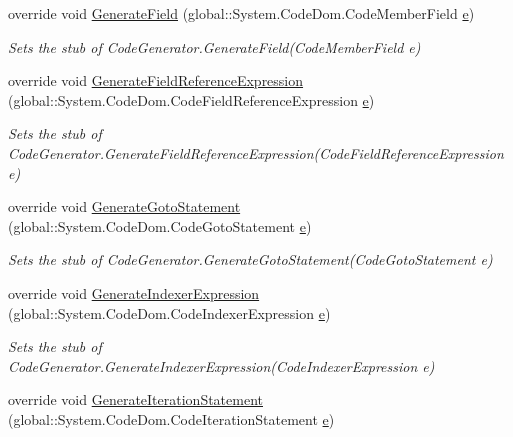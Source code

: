 \begin{DoxyCompactItemize}
override void \hyperlink{class_system_1_1_code_dom_1_1_compiler_1_1_fakes_1_1_stub_code_compiler_a0525ef218029c9289eafd4fbdfe2da62}{Generate\-Field} (global\-::\-System.\-Code\-Dom.\-Code\-Member\-Field \hyperlink{jquery-1_810_82_8min_8js_a2c038346d47955cbe2cb91e338edd7e1}{e})
\begin{DoxyCompactList}\small\item\em Sets the stub of Code\-Generator.\-Generate\-Field(\-Code\-Member\-Field e)\end{DoxyCompactList}\item 
override void \hyperlink{class_system_1_1_code_dom_1_1_compiler_1_1_fakes_1_1_stub_code_compiler_abc06b05254aff7094e113cb6628f3dbc}{Generate\-Field\-Reference\-Expression} (global\-::\-System.\-Code\-Dom.\-Code\-Field\-Reference\-Expression \hyperlink{jquery-1_810_82_8min_8js_a2c038346d47955cbe2cb91e338edd7e1}{e})
\begin{DoxyCompactList}\small\item\em Sets the stub of Code\-Generator.\-Generate\-Field\-Reference\-Expression(\-Code\-Field\-Reference\-Expression e)\end{DoxyCompactList}\item 
override void \hyperlink{class_system_1_1_code_dom_1_1_compiler_1_1_fakes_1_1_stub_code_compiler_aa9203074915da46fcabfa9da6827e6c1}{Generate\-Goto\-Statement} (global\-::\-System.\-Code\-Dom.\-Code\-Goto\-Statement \hyperlink{jquery-1_810_82_8min_8js_a2c038346d47955cbe2cb91e338edd7e1}{e})
\begin{DoxyCompactList}\small\item\em Sets the stub of Code\-Generator.\-Generate\-Goto\-Statement(\-Code\-Goto\-Statement e)\end{DoxyCompactList}\item 
override void \hyperlink{class_system_1_1_code_dom_1_1_compiler_1_1_fakes_1_1_stub_code_compiler_ac00c37e4c6b98f59653086087c70c258}{Generate\-Indexer\-Expression} (global\-::\-System.\-Code\-Dom.\-Code\-Indexer\-Expression \hyperlink{jquery-1_810_82_8min_8js_a2c038346d47955cbe2cb91e338edd7e1}{e})
\begin{DoxyCompactList}\small\item\em Sets the stub of Code\-Generator.\-Generate\-Indexer\-Expression(\-Code\-Indexer\-Expression e)\end{DoxyCompactList}\item 
override void \hyperlink{class_system_1_1_code_dom_1_1_compiler_1_1_fakes_1_1_stub_code_compiler_a1f8e69a1727d1af0625942e0fc9db933}{Generate\-Iteration\-Statement} (global\-::\-System.\-Code\-Dom.\-Code\-Iteration\-Statement \hyperlink{jquery-1_810_82_8min_8js_a2c038346d47955cbe2cb91e338edd7e1}{e})

\end{DoxyCompactItemize}
